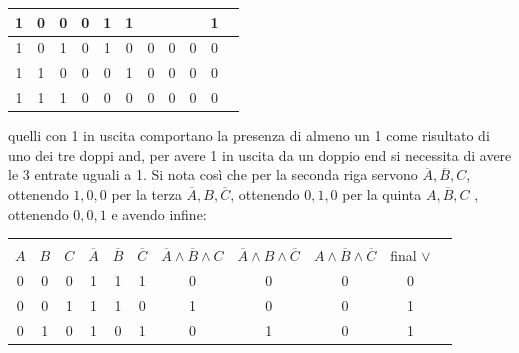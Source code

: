 \documentclass[a4paper,12pt, oneside]{book}
\begin{document}
\begin{esercizio}
\begin{center}
\begin{tabular}{|c|c|c|c|c|c|c|c|c|c|c|}
      \hline
      1   & 0   & 0   & 0              & 1              & 1              &                  &                  &                 & 1            \\
      \hline
      1   & 0   & 1   & 0              & 1              & 0              & 0                & 0                & 0               & 0            \\
      \hline
      1   & 1   & 0   & 0              & 0              & 1              & 0                & 0                & 0               & 0            \\
      \hline
      1   & 1   & 1   & 0              & 0              & 0              & 0                & 0                & 0               & 0            \\
      \hline
    \end{tabular}
  \end{center}
  quelli con 1 in uscita comportano la presenza di almeno un 1 come risultato di uno dei tre doppi and, per avere 1 in uscita da un doppio end si necessita di avere le 3 entrate uguali a 1. Si nota così che per la seconda riga servono $\overline{A},\overline{B},C$, ottenendo $1,0,0$  per la terza $\overline{A}, B, \overline{C}$, ottenendo $0,1,0$ per la quinta $A, \overline{B}, C$ , ottenendo $0,0,1$ e avendo infine:
  \begin{center}
    \begin{tabular}{|c|c|c|c|c|c|c|c|c|c|c|}
      \hline
      &     &     &                &                &                &                                           &                                           &                                          &              \\
      $A$ & $B$ & $C$ & $\overline{A}$ & $\overline{B}$ & $\overline{C}$ & $\overline{A}\wedge \overline{B}\wedge C$ & $\overline{A}\wedge B\wedge\overline{C} $ & $A\wedge \overline{B}\wedge\overline{C}$ & final $\vee$ \\
      \hline
      0   & 0   & 0   & 1              & 1              & 1              & 0                                         & 0                                         & 0                                        & 0            \\
      \hline
      0   & 0   & 1   & 1              & 1              & 0              & 1                                         & 0                                         & 0                                        & 1            \\
      \hline
      0   & 1   & 0   & 1              & 0              & 1              & 0                                         & 1                                         & 0                                        & 1            \\

\end{tabular}
\end{center}
\end{esercizio}
\end{document}
